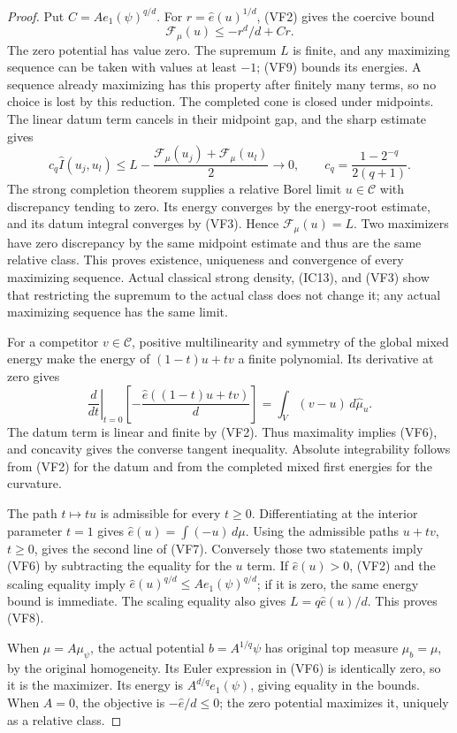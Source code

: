 \documentclass[11pt,a4paper]{article}
\numberwithin{equation}{section}
\theoremstyle{definition}
\theoremstyle{remark}
\begin{document}
\begin{proof}
Put $C=Ae_1(\psi)^{q/d}$.  For $r=\widehat e(u)^{1/d}$,
(VF2) gives the coercive bound
\[
                    \mathcal F_\mu(u)\leq-r^d/d+Cr.
 \tag{VF9}
\]
The zero potential has value zero.  The supremum $L$ is finite,
and any maximizing sequence can be taken with values at least
$-1$; (VF9) bounds its energies.  A sequence already maximizing
has this property after finitely many terms, so no choice is
lost by this reduction.  The completed cone is closed under
midpoints.  The linear datum term cancels in their midpoint gap,
and the sharp estimate gives
\[
 c_q\widehat I(u_j,u_l)
   \leq L-\frac{\mathcal F_\mu(u_j)+\mathcal F_\mu(u_l)}2
                      \longrightarrow0,
 \qquad c_q=\frac{1-2^{-q}}{2(q+1)}.
 \tag{VF10}
\]
The strong completion theorem supplies a relative Borel limit
$u\in\mathscr C$ with discrepancy tending to zero.  Its energy
converges by the energy-root estimate, and its datum integral
converges by (VF3).  Hence $\mathcal F_\mu(u)=L$.
Two maximizers have zero discrepancy by the same midpoint
estimate and thus are the same relative class.  This proves
existence, uniqueness and convergence of every maximizing
sequence.  Actual classical strong density, (IC13), and (VF3)
show that restricting the supremum to the actual class does
not change it; any actual maximizing sequence has the same limit.

For a competitor $v\in\mathscr C$, positive multilinearity
and symmetry of the global mixed energy make the energy of
$(1-t)u+tv$ a finite polynomial.  Its derivative at zero gives
\[
 \left.\frac d{dt}\right|_{t=0}
       \left[-\frac{\widehat e((1-t)u+tv)}d\right]
                           =\int_V(v-u)\,d\widehat\mu_u.
\]
The datum term is linear and finite by (VF2).  Thus maximality
implies (VF6), and concavity gives the converse tangent inequality.
Absolute integrability follows from (VF2) for the datum and
from the completed mixed first energies for the curvature.

The path $t\mapsto tu$ is admissible for every $t\geq0$.
Differentiating at the interior parameter $t=1$ gives
$\widehat e(u)=\int(-u)\,d\mu$.  Using the admissible paths
$u+tv$, $t\geq0$, gives the second line of (VF7).  Conversely
those two statements imply (VF6) by subtracting the equality
for the $u$ term.  If $\widehat e(u)>0$, (VF2) and the
scaling equality imply
$\widehat e(u)^{q/d}\leq Ae_1(\psi)^{q/d}$; if it is zero,
the same energy bound is immediate.  The scaling equality also
gives $L=q\widehat e(u)/d$.  This proves (VF8).

When $\mu=A\mu_\psi$, the actual potential $b=A^{1/q}\psi$
has original top measure $\mu_b=\mu$, by the original
homogeneity.  Its Euler expression in (VF6) is identically
zero, so it is the maximizer.  Its energy is
$A^{d/q}e_1(\psi)$, giving equality in the bounds.
When $A=0$, the objective is $-\widehat e/d\leq0$;
the zero potential maximizes it, uniquely as a relative class.
\end{proof}
\end{document}
